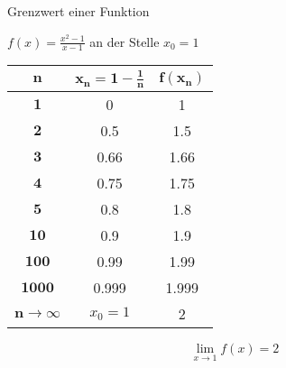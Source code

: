 \begin{example2}{Grenzwert einer Funktion}

    $f(x)=\frac{x^{2}-1}{x-1}$ an der Stelle $x_{0}=1$

    \begin{center}
    \begin{tabular}{|c|c|c|}
    \hline
    $\boldsymbol{n}$ & $\boldsymbol{x}_{\boldsymbol{n}}=\mathbf{1}-\frac{\mathbf{1}}{\boldsymbol{n}}$ & $\boldsymbol{f}\left(\boldsymbol{x}_{\boldsymbol{n}}\right)$ \\
    \hline
    $\mathbf{1}$ & 0 & 1 \\
    \hline
    $\mathbf{2}$ & 0.5 & 1.5 \\
    \hline
    $\mathbf{3}$ & 0.66 & 1.66 \\
    \hline
    $\mathbf{4}$ & 0.75 & 1.75 \\
    \hline
    $\mathbf{5}$ & 0.8 & 1.8 \\
    \hline
    $\mathbf{1 0}$ & 0.9 & 1.9 \\
    \hline
    $\mathbf{1 0 0}$ & 0.99 & 1.99 \\
    \hline
    $\mathbf{1 0 0 0}$ & 0.999 & 1.999 \\
    \hline
    $\boldsymbol{n} \rightarrow \infty$ & $x_{0}=1$ & 2 \\
    \hline
    \end{tabular}
    \end{center}
    
    $$
    \lim _{x \rightarrow 1} f(x)=2
    $$
\end{example2}